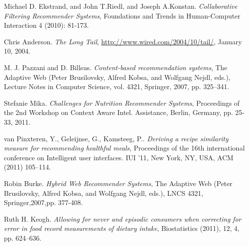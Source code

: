 \documentclass[a4paper, 11pt]{article}
\begin{document}
\newpage
\begin{thebibliography}{9}
Michael D. Ekstrand, and John T.Riedl, and Joseph A.Konstan. \textit{Collaborative Filtering Recommender Systems}, Foundations and Trends in Human-Computer Interaction 4 (2010): 81-173.

Chris Anderson. \textit{The Long Tail},  \url{http://www.wired.com/2004/10/tail/},  January 10, 2004.

M. J. Pazzani and D. Billsus. \textit{Content-based recommendation systems}, The Adaptive Web (Peter Brusilovsky, Alfred Kobsa, and Wolfgang Nejdl, eds.), Lecture Notes in Computer Science, vol. 4321, Springer, 2007, pp. 325–341.

Stefanie Mika. \textit{Challenges for Nutrition Recommender Systems}, Proceedings of the 2nd Workshop on Context Aware Intel. Assistance, Berlin, Germany, pp. 25-33, 2011.

van Pinxteren, Y., Geleijnse, G., Kamsteeg, P.. \textit{Deriving a recipe similarity measure for recommending healthful meals}, Proceedings of the 16th international conference on Intelligent user interfaces. IUI ’11, New York, NY, USA, ACM (2011) 105–114.

Robin Burke. \textit{Hybrid Web Recommender Systems}, The Adaptive Web (Peter Brusilovsky, Alfred Kobsa, and Wolfgang Nejdl, eds.), LNCS 4321, Springer,2007,pp. 377-408.

Ruth H. Keogh. \textit{Allowing for never and episodic consumers when correcting for error in food record measurements of dietary intake}, Biostatistics (2011), 12, 4, pp. 624–636.

\end{thebibliography}
\end{document}
